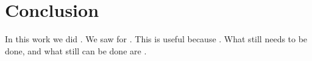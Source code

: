 \section{Conclusion} \label{sec:conclusion}
In this work we did \anote{}. We saw \anote{} for \anote{}. This is useful because \anote{}. What still needs to be done, and what still can be done are \anote{}.
